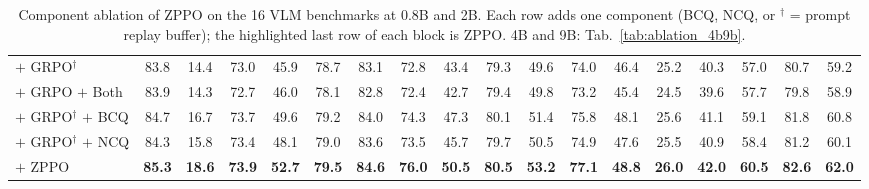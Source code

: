 \begin{table}[t!]
{\begin{tabular}{l*{17}{c}}
    $+$ GRPO$^{\dagger}$ & 83.8 & 14.4 & 73.0 & 45.9 & 78.7 & 83.1 & 72.8 & 43.4 & 79.3 & 49.6 & 74.0 & 46.4 & 25.2 & 40.3 & 57.0 & 80.7 & \cellcolor{gray!10}59.2 \\
    $+$ GRPO $+$ Both & 83.9 & 14.3 & 72.7 & 46.0 & 78.1 & 82.8 & 72.4 & 42.7 & 79.4 & 49.8 & 73.2 & 45.4 & 24.5 & 39.6 & 57.7 & 79.8 & \cellcolor{gray!10}58.9 \\
    $+$ GRPO$^{\dagger}$ $+$ BCQ & 84.7 & 16.7 & 73.7 & 49.6 & 79.2 & 84.0 & 74.3 & 47.3 & 80.1 & 51.4 & 75.8 & 48.1 & 25.6 & 41.1 & 59.1 & 81.8 & \cellcolor{gray!10}60.8 \\
    $+$ GRPO$^{\dagger}$ $+$ NCQ & 84.3 & 15.8 & 73.4 & 48.1 & 79.0 & 83.6 & 73.5 & 45.7 & 79.7 & 50.5 & 74.9 & 47.6 & 25.5 & 40.9 & 58.4 & 81.2 & \cellcolor{gray!10}60.1 \\
    \rowcolor{colorful}
    $+$ ZPPO & \textbf{85.3} & \textbf{18.6} & \textbf{73.9} & \textbf{52.7} & \textbf{79.5} & \textbf{84.6} & \textbf{76.0} & \textbf{50.5} & \textbf{80.5} & \textbf{53.2} & \textbf{77.1} & \textbf{48.8} & \textbf{26.0} & \textbf{42.0} & \textbf{60.5} & \textbf{82.6} & \cellcolor{gray!10}\textbf{62.0} \\
    \bottomrule
    \end{tabular}
    }
    \vspace{-3mm}
    \caption{Component ablation of ZPPO on the 16 VLM benchmarks at 0.8B and 2B. Each row adds one component (BCQ, NCQ, or $^{\dagger}$ = prompt replay buffer); the highlighted last row of each block is ZPPO. 4B and 9B: Tab.~\ref{tab:ablation_4b9b}.}
    \label{tab:ablation}
\end{table}

